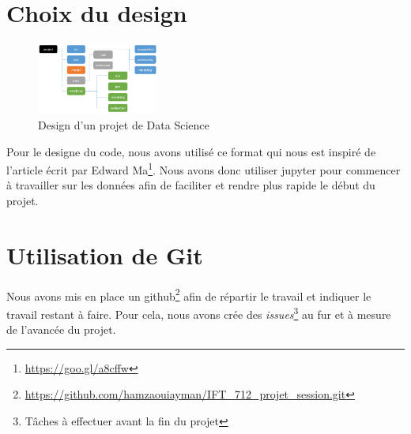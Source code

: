 \documentclass[12pt]{article}
\begin{document}
\newpage
\appendix
\section{Choix du design}
\begin{figure}
	\includegraphics[width=4cm]{./projet_structure.png}
	\caption{Design d'un projet de Data Science}
\end{figure}
Pour le designe du code, nous avons utilisé ce format qui nous est inspiré de l'article écrit par Edward Ma\footnote{\url{https://goo.gl/a8cffw}}. Nous avons donc utiliser jupyter pour commencer à travailler sur les données afin de faciliter et rendre plus rapide le début du projet.


\section{Utilisation de Git}
Nous avons mis en place un github\footnote{\url{https://github.com/hamzaouiayman/IFT_712_projet_session.git}} afin de répartir le travail et indiquer le travail restant à faire. Pour cela, nous avons crée des \textit{issues}\footnote{Tâches à effectuer avant la fin du projet} au fur et à mesure de l'avancée du projet.
\end{document}
